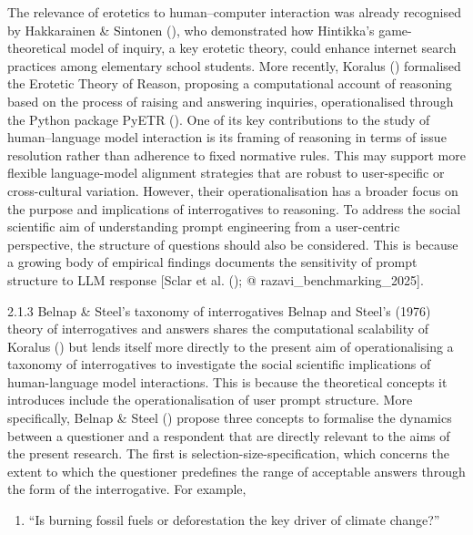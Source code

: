 \documentclass[
  12pt,
]{article}
\providecommand{\tightlist}{%
  \setlength{\itemsep}{0pt}\setlength{\parskip}{0pt}}
\begin{document}
The relevance of erotetics to human--computer interaction was already recognised by Hakkarainen \& Sintonen (), who demonstrated how Hintikka's game-theoretical model of inquiry, a key erotetic theory, could enhance internet search practices among elementary school students. More recently, Koralus () formalised the Erotetic Theory of Reason, proposing a computational account of reasoning based on the process of raising and answering inquiries, operationalised through the Python package PyETR (). One of its key contributions to the study of human--language model interaction is its framing of reasoning in terms of issue resolution rather than adherence to fixed normative rules. This may support more flexible language-model alignment strategies that are robust to user-specific or cross-cultural variation. However, their operationalisation has a broader focus on the purpose and implications of interrogatives to reasoning. To address the social scientific aim of understanding prompt engineering from a user-centric perspective, the structure of questions should also be considered. This is because a growing body of empirical findings documents the sensitivity of prompt structure to LLM response {[}Sclar et al. (); @ razavi\_benchmarking\_2025{]}.

2.1.3 Belnap \& Steel's taxonomy of interrogatives
Belnap and Steel's (1976) theory of interrogatives and answers shares the computational scalability of Koralus () but lends itself more directly to the present aim of operationalising a taxonomy of interrogatives to investigate the social scientific implications of human-language model interactions. This is because the theoretical concepts it introduces include the operationalisation of user prompt structure. More specifically, Belnap \& Steel () propose three concepts to formalise the dynamics between a questioner and a respondent that are directly relevant to the aims of the present research. The first is selection-size-specification, which concerns the extent to which the questioner predefines the range of acceptable answers through the form of the interrogative. For example,

\begin{enumerate}
\def\labelenumi{(\arabic{enumi})}
\tightlist
\item
  ``Is burning fossil fuels or deforestation the key driver of climate change?''
\end{enumerate}
\end{document}
